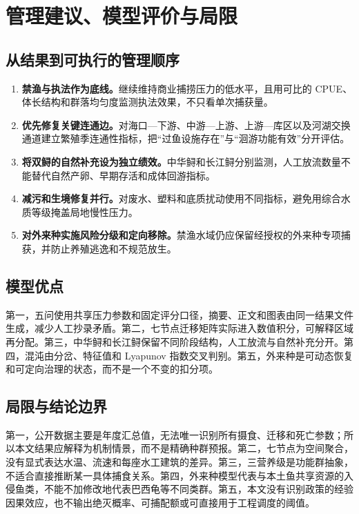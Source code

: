 \documentclass[withoutpreface,bwprint]{cumcmthesis}
\begin{document}
\section{管理建议、模型评价与局限}

\subsection{从结果到可执行的管理顺序}

\begin{enumerate}[label=\arabic*.,leftmargin=2.5em]
\item \textbf{禁渔与执法作为底线。}继续维持商业捕捞压力的低水平，且用可比的 CPUE、体长结构和群落均匀度监测执法效果，不只看单次捕获量。
\item \textbf{优先修复关键连通边。}对海口—下游、中游—上游、上游—库区以及河湖交换通道建立繁殖季连通性指标，把“过鱼设施存在”与“洄游功能有效”分开评估。
\item \textbf{将双鲟的自然补充设为独立绩效。}中华鲟和长江鲟分别监测，人工放流数量不能替代自然产卵、早期存活和成体回游指标。
\item \textbf{减污和生境修复并行。}对废水、塑料和底质扰动使用不同指标，避免用综合水质等级掩盖局地慢性压力。
\item \textbf{对外来种实施风险分级和定向移除。}禁渔水域仍应保留经授权的外来种专项捕获，并防止养殖逃逸和不规范放生。
\end{enumerate}

\subsection{模型优点}

第一，五问使用共享压力参数和固定评分口径，摘要、正文和图表由同一结果文件生成，减少人工抄录矛盾。第二，七节点迁移矩阵实际进入数值积分，可解释区域再分配。第三，中华鲟和长江鲟保留不同阶段结构，人工放流与自然补充分开。第四，混沌由分岔、特征值和 Lyapunov 指数交叉判别。第五，外来种是可动态恢复和可定向治理的状态，而不是一个不变的扣分项。\AIassistmark

\subsection{局限与结论边界}

第一，公开数据主要是年度汇总值，无法唯一识别所有摄食、迁移和死亡参数；所以本文结果应解释为机制情景，而不是精确种群预报。第二，七节点为空间聚合，没有显式表达水温、流速和每座水工建筑的差异。第三，三营养级是功能群抽象，不适合直接推断某一具体捕食关系。第四，外来种模型代表与本土鱼共享资源的入侵鱼类，不能不加修改地代表巴西龟等不同类群。第五，本文没有识别政策的经验因果效应，也不输出绝灭概率、可捕配额或可直接用于工程调度的阈值。
\end{document}
